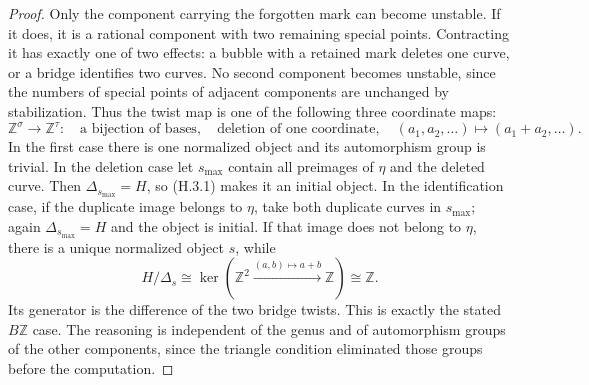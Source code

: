 \begin{proof}
Only the component carrying the forgotten mark can become
unstable. If it does, it is a rational component with two
remaining special points. Contracting it has exactly one of two
effects: a bubble with a retained mark deletes one curve, or a
bridge identifies two curves. No second component becomes
unstable, since the numbers of special points of adjacent
components are unchanged by stabilization. Thus the twist map
is one of the following three coordinate maps:
\[
 \mathbb Z^\sigma\to\mathbb Z^\tau:
 \quad\text{a bijection of bases},\quad
 \text{deletion of one coordinate},\quad
 (a_1,a_2,\ldots)\mapsto(a_1+a_2,\ldots).
\]
In the first case there is one normalized object and its
automorphism group is trivial. In the deletion case let $s_{\max}$
contain all preimages of $\eta$ and the deleted curve. Then
$\Delta_{s_{\max}}=H$, so (H.3.1) makes it an initial object.
In the identification case, if the duplicate image belongs to
$\eta$, take both duplicate curves in $s_{\max}$; again
$\Delta_{s_{\max}}=H$ and the object is initial. If that image
does not belong to $\eta$, there is a unique normalized object
$s$, while
\[
 H/\Delta_s\cong
 \ker(\mathbb Z^2\xrightarrow{(a,b)\mapsto a+b}\mathbb Z)
 \cong\mathbb Z.
\]
Its generator is the difference of the two bridge twists. This
is exactly the stated $B\mathbb Z$ case. The reasoning is
independent of the genus and of automorphism groups of the
other components, since the triangle condition eliminated those
groups before the computation.
\end{proof}

